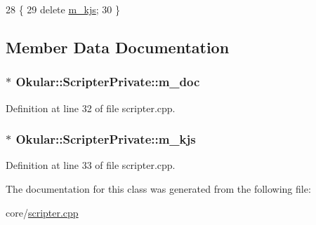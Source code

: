 \begin{DoxyCode}
28         \{
29             \textcolor{keyword}{delete} \hyperlink{classOkular_1_1ScripterPrivate_a6e9f75481e8e1fe57efbffccd08a2077}{m\_kjs};
30         \}
\end{DoxyCode}


\subsection{Member Data Documentation}
\hypertarget{classOkular_1_1ScripterPrivate_ada92eacd9472f54bfa575c84bd69db8e}{
\subsubsection[{m\+\_\+doc}]{$\ast$ Okular\+::\+Scripter\+Private\+::m\+\_\+doc}}\label{classOkular_1_1ScripterPrivate_ada92eacd9472f54bfa575c84bd69db8e}


Definition at line 32 of file scripter.\+cpp.

\hypertarget{classOkular_1_1ScripterPrivate_a6e9f75481e8e1fe57efbffccd08a2077}{
\subsubsection[{m\+\_\+kjs}]{$\ast$ Okular\+::\+Scripter\+Private\+::m\+\_\+kjs}}\label{classOkular_1_1ScripterPrivate_a6e9f75481e8e1fe57efbffccd08a2077}


Definition at line 33 of file scripter.\+cpp.



The documentation for this class was generated from the following file\+:\begin{DoxyCompactItemize}
\item 
core/\hyperlink{scripter_8cpp}{scripter.\+cpp}\end{DoxyCompactItemize}
